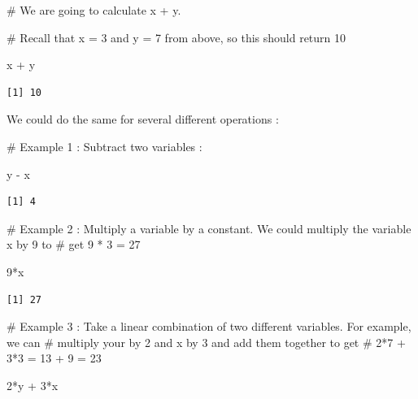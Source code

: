 \documentclass[
  letterpaper,
  DIV=11,
  numbers=noendperiod]{scrreprt}
\newenvironment{Shaded}{\begin{snugshade}}{\end{snugshade}}
\newcommand{\CommentTok}[1]{\textcolor[rgb]{0.37,0.37,0.37}{#1}}
\newcommand{\DecValTok}[1]{\textcolor[rgb]{0.68,0.00,0.00}{#1}}
\newcommand{\NormalTok}[1]{\textcolor[rgb]{0.00,0.23,0.31}{#1}}
\newcommand{\SpecialCharTok}[1]{\textcolor[rgb]{0.37,0.37,0.37}{#1}}
\begin{document}
\begin{Shaded}
\begin{Highlighting}[]
\CommentTok{\# We are going to calculate x + y. }

\CommentTok{\# Recall that x = 3 and y = 7 from above, so this should return 10}

\NormalTok{x }\SpecialCharTok{+}\NormalTok{ y}
\end{Highlighting}
\end{Shaded}

\begin{verbatim}
[1] 10
\end{verbatim}

We could do the same for several different operations :

\begin{Shaded}
\begin{Highlighting}[]
\CommentTok{\# Example 1 : Subtract two variables :}

\NormalTok{y }\SpecialCharTok{{-}}\NormalTok{ x}
\end{Highlighting}
\end{Shaded}

\begin{verbatim}
[1] 4
\end{verbatim}

\begin{Shaded}
\begin{Highlighting}[]
\CommentTok{\# Example 2 : Multiply a variable by a constant. We could multiply the variable x by 9 to}
\CommentTok{\# get 9 * 3 = 27}

\DecValTok{9}\SpecialCharTok{*}\NormalTok{x}
\end{Highlighting}
\end{Shaded}

\begin{verbatim}
[1] 27
\end{verbatim}

\begin{Shaded}
\begin{Highlighting}[]
\CommentTok{\# Example 3 : Take a linear combination of two different variables. For example, we can}
\CommentTok{\# multiply your by 2 and x by 3 and add them together to get }
\CommentTok{\# 2*7 + 3*3 = 13 + 9 = 23 }

\DecValTok{2}\SpecialCharTok{*}\NormalTok{y }\SpecialCharTok{+} \DecValTok{3}\SpecialCharTok{*}\NormalTok{x}
\end{Highlighting}
\end{Shaded}
\end{document}
